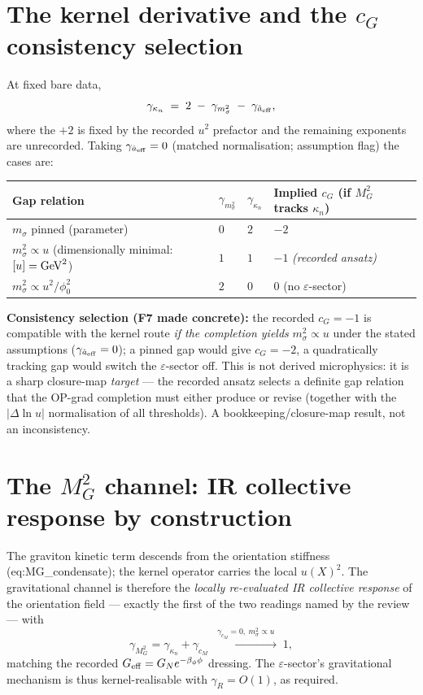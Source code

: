 \documentclass[11pt,a4paper]{article}
\begin{document}
\section{The kernel derivative and the $c_G$ consistency selection}
At fixed bare data,
\[
\gamma_{\kappa_n}\;=\;2\;-\;\gamma_{m_\sigma^2}\;-\;\gamma_{\hat a_{\rm eff}},
\]
where the $+2$ is fixed by the recorded $u^2$ prefactor and the remaining
exponents are unrecorded. Taking $\gamma_{\hat a_{\rm eff}}=0$ (matched
normalisation; assumption flag) the cases are:
\renewcommand{\arraystretch}{1.15}\small
\begin{longtable}{@{}p{4.6cm}p{2.2cm}p{2.4cm}p{4.0cm}@{}}
\toprule \textbf{Gap relation} & $\gamma_{m_\sigma^2}$ & $\gamma_{\kappa_n}$ &
\textbf{Implied $c_G$ (if $M_G^2$ tracks $\kappa_n$)} \\ \midrule \endhead
\bottomrule \endfoot
$m_\sigma$ pinned (parameter) & $0$ & $2$ & $-2$ \\
$m_\sigma^2\propto u$ (dimensionally minimal: $[u]={\rm GeV}^2$) & $1$ & $1$ &
$-1$ \emph{(recorded ansatz)} \\
$m_\sigma^2\propto u^2/\phi_0^2$ & $2$ & $0$ & $0$ (no $\varepsilon$-sector) \\
\end{longtable}\normalsize
\textbf{Consistency selection (F7 made concrete):} the recorded
$c_G=-1$ is compatible with the kernel route \emph{if the completion yields}
$m_\sigma^2\propto u$ under the stated assumptions ($\gamma_{\hat a_{\rm
eff}}=0$); a pinned gap would give $c_G=-2$, a quadratically tracking gap would
switch the $\varepsilon$-sector off. This is not derived microphysics: it is a
sharp closure-map \emph{target} --- the recorded ansatz selects a definite gap
relation that the OP-grad completion must either produce or revise (together
with the $|\Delta\ln u|$ normalisation of all thresholds). A
bookkeeping/closure-map result, not an inconsistency.

\section{The $M_G^2$ channel: IR collective response by construction}
The graviton kinetic term descends from the orientation stiffness
(eq:MG\_condensate); the kernel operator carries the local $u(X)^2$. The
gravitational channel is therefore the \emph{locally re-evaluated IR collective
response} of the orientation field --- exactly the first of the two readings
named by the review --- with
\[
\gamma_{M_G^2}=\gamma_{\kappa_n}+\gamma_{c_M}\;\xrightarrow{\;\gamma_{c_M}=0,
\ m_\sigma^2\propto u\;}\;1,
\]
matching the recorded $G_{\rm eff}=G_Ne^{-\beta_\phi\phi}$ dressing. The
$\varepsilon$-sector's gravitational mechanism is thus kernel-realisable with
$\gamma_R=O(1)$, as required.
\end{document}
